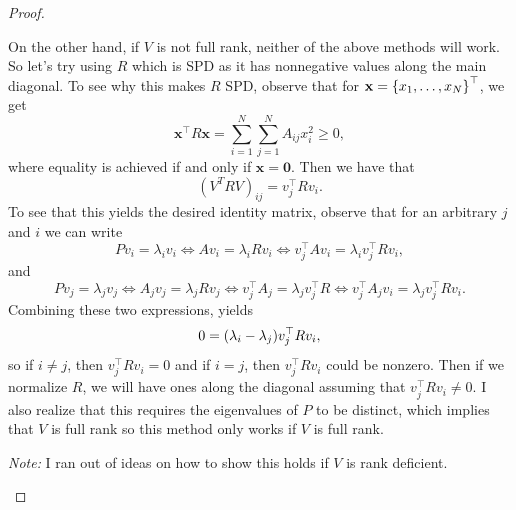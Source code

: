 \documentclass[12pt]{report}
\newenvironment{problem}{}{\newpage}
\begin{document}
\begin{problem}
\begin{proof}
\begin{enumerate}
    \noindent
    On the other hand, if $V$ is not full rank, neither of the above methods will work. So let's try using $R$ which is SPD as it has nonnegative values along the main diagonal. To see why this makes $R$ SPD, observe that 
    for $\mathbf{x}={\left\{x_1,\dots,x_N\right\}}^\top$, we get
    \begin{equation*}
        \mathbf{x}^\top R \mathbf{x} = \sum_{i=1}^N \sum_{j=1}^N A_{i j} x_i^2 \geq 0,
    \end{equation*}
    where equality is achieved if and only if $\mathbf{x} = \mathbf{0}$. Then we have that
    \begin{equation*}
        (V^T R V)_{ij} = v_j^\top R v_i.
    \end{equation*}
    To see that this yields the desired identity matrix, observe that for an arbitrary $j$ and $i$ we can write
    \begin{equation*}
        Pv_i = \lambda_i v_i \iff Av_i = \lambda_i R v_i \iff v_j^\top Av_i = \lambda_i v_j^\top R v_i,
    \end{equation*}
    and
    \begin{equation*}
        Pv_j = \lambda_j v_j \iff A_j v_j = \lambda_j R v_j \iff v_j^\top A_j = \lambda_j v_j^\top R \iff v_j^\top A_j v_i = \lambda_j v_j^\top R v_i. 
    \end{equation*}
    Combining these two expressions, yields 
    \begin{equation*}
        0 = {\left(\lambda_i - \lambda_j\right)}v_j^\top R v_i,
    \end{equation*}
    so if $i \neq j$, then $v_j^\top R v_i = 0$ and if $i = j$, then $v_j^\top R v_i$ could be nonzero. Then if we normalize $R$, we will have ones along the diagonal assuming that $v_j^\top R v_i \neq 0$. I also realize that this requires the eigenvalues of $P$ to be distinct, which implies that $V$ is full rank so this method only works if $V$ is full rank.

    \textit{Note:} I ran out of ideas on how to show this holds if $V$ is rank deficient.


\end{enumerate}
\end{proof}
\end{problem}
\end{document}
